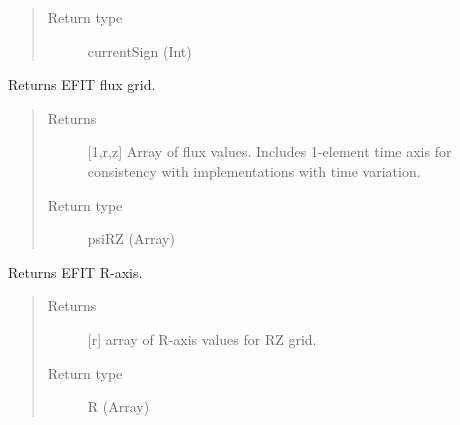 \documentclass[letterpaper,10pt,english]{sphinxmanual}
\begin{document}
\begin{fulllineitems}
\begin{fulllineitems}
\begin{quote}
\begin{description}
\item[{Return type}] \leavevmode
currentSign (Int)

\end{description}\end{quote}

\end{fulllineitems}


\begin{fulllineitems}
\label{\detokenize{eqtools:eqtools.eqdskreader.EqdskReader.getFluxGrid}}
Returns EFIT flux grid.
\begin{quote}\begin{description}
\item[{Returns}] \leavevmode
{[}1,r,z{]} Array of flux values.  Includes 1-element
time axis for consistency with
{\hyperref[\detokenize{eqtools:eqtools.core.Equilibrium}]{}} implementations
with time variation.

\item[{Return type}] \leavevmode
psiRZ (Array)

\end{description}\end{quote}

\end{fulllineitems}


\begin{fulllineitems}
\label{\detokenize{eqtools:eqtools.eqdskreader.EqdskReader.getRGrid}}
Returns EFIT R-axis.
\begin{quote}\begin{description}
\item[{Returns}] \leavevmode
{[}r{]} array of R-axis values for RZ grid.

\item[{Return type}] \leavevmode
R (Array)

\end{description}\end{quote}


\end{fulllineitems}
\end{fulllineitems}
\end{document}
